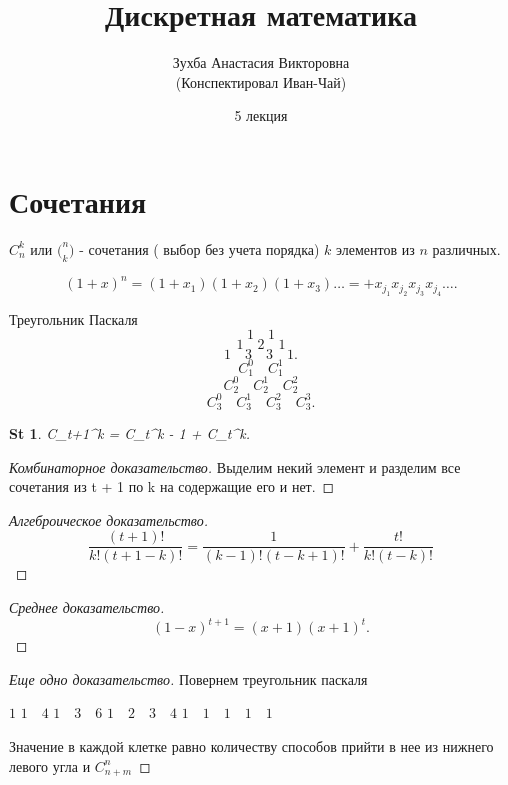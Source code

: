 \documentclass[a5paper, 10pt]{article}
\theoremstyle{plain}
\newtheorem*{statement}{St}
\begin{document}
	\author{Зухба Анастасия Викторовна\\(Конспектировал Иван-Чай)}
	\date{5 лекция}
	\title{Дискретная математика}

	\linespread{1.4}
	\selectfont

	\maketitle
	\newpage

	\tableofcontents

    \section{Сочетания}

    $ C_n^k $ или $ \big(^n_k\big) $ - сочетания ( выбор без учета порядка)
    $ k $ элементов из $ n $ различных.

    \[
        (1 + x)^n = (1 + x_1 )(1 + x_2 )(1 + x_3 ) \dots = + x_{j_1 } x_{j_2 } x_{j_3 } x_{j_4} \dots

    .\]

    Треугольник Паскаля
    \[
        1 \quad 1
    \]\[
        1 \quad 2 \quad 1
    \]\[
        1 \quad 3 \quad 3 \quad 1
    .\]
    \[
        C^0_1 \quad C^1_1
    \]\[
        C^0_2 \quad C^1_2 \quad C^2_2
    \]\[
        C^0_3 \quad C^1_3 \quad C^2_3 \quad C^3_3
    .\]

    \begin{statement}
        C_{t+1}^k = C_t^{k - 1} + C_t^k.
    \end{statement}

    \begin{proof}[Комбинаторное доказательство]
        Выделим некий элемент и разделим все сочетания из t + 1 по k на содержащие его и нет.
    \end{proof}

    \begin{proof}[Алгеброическое доказательство]
        \[ \frac{(t+1)!}{k!(t + 1 - k)!} =  \frac{1}{(k-1)! (t - k + 1)!} +  \frac{t!}{k!(t-k)!} \]
    \end{proof}

    \begin{proof}[Среднее доказательство]
        \[
            (1 - x )^{t + 1} = (x + 1)(x + 1)^t
        .\]
    \end{proof}

    \begin{proof}[Еще одно доказательство]
    Повернем треугольник паскаля

    \noindent
    $ 1 $ \newline
    $ 1 \quad 4 $ \newline
    $ 1 \quad 3 \quad 6 $ \newline
    $ 1 \quad 2 \quad 3 \quad 4 $ \newline
    $ 1 \quad 1 \quad 1 \quad 1 \quad 1 $ \newline

    Значение в каждой клетке равно количеству способов прийти в нее из нижнего левого угла
    и $ C^n_{n + m} $
    \end{proof}
\end{document}
